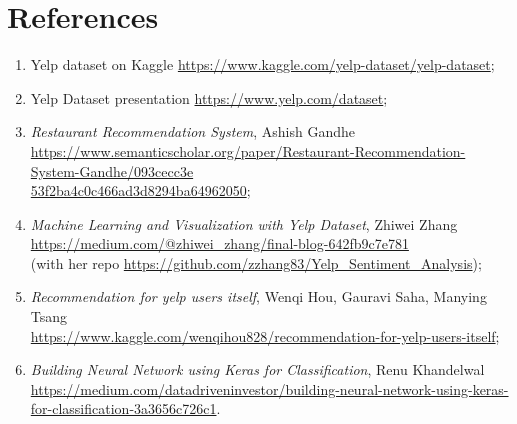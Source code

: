 
\section{References}



\begin{enumerate}
    \item Yelp dataset on Kaggle \href{https://www.kaggle.com/yelp-dataset/yelp-dataset}{https://www.kaggle.com/yelp-dataset/yelp-dataset};
    \item Yelp Dataset presentation \href{https://www.yelp.com/dataset}{https://www.yelp.com/dataset};
    \item \textit{Restaurant Recommendation System}, Ashish Gandhe \\ \href{https://www.semanticscholar.org/paper/Restaurant-Recommendation-System-Gandhe/093cecc3e53f2ba4c0c466ad3d8294ba64962050}{https://www.semanticscholar.org/paper/Restaurant-Recommendation-System-Gandhe/093cecc3e\\53f2ba4c0c466ad3d8294ba64962050}; \label{Gandhe}
    \item \textit{Machine Learning and Visualization with Yelp Dataset}, Zhiwei Zhang \\ \href{https://medium.com/@zhiwei_zhang/final-blog-642fb9c7e781}{https://medium.com/@zhiwei\_zhang/final-blog-642fb9c7e781} \\
    (with her repo \href{https://github.com/zzhang83/Yelp_Sentiment_Analysis}{https://github.com/zzhang83/Yelp\_Sentiment\_Analysis}); \label{Zhang}
    \item \textit{Recommendation for yelp users itself}, Wenqi Hou, Gauravi Saha, Manying Tsang \\ \href{https://www.kaggle.com/wenqihou828/recommendation-for-yelp-users-itself}{https://www.kaggle.com/wenqihou828/recommendation-for-yelp-users-itself}; \label{Hou}
    \item \textit{Building Neural Network using Keras for Classification}, Renu Khandelwal \\ \href{https://medium.com/datadriveninvestor/building-neural-network-using-keras-for-classification-3a3656c726c1}{https://medium.com/datadriveninvestor/building-neural-network-using-keras-\\for-classification-3a3656c726c1}.\label{Khandelwal}
\end{enumerate}



